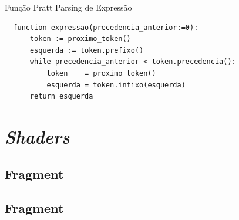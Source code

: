 \documentclass[english, 
               brazil, 
               bsc] %
               {dcomp-abntex2}
\begin{document}
\begin{algoritmo}[H]
	\caption{Função Pratt Parsing de Expressão}
	\label{alg1}
  \begin{lstlisting}
  function expressao(precedencia_anterior:=0):
      token := proximo_token()
      esquerda := token.prefixo()
      while precedencia_anterior < token.precedencia():
          token    = proximo_token()
          esquerda = token.infixo(esquerda)
      return esquerda
  \end{lstlisting}
\end{algoritmo}

%
%



\section{\textit{Shaders}}
\subsection{Fragment}
\subsection{Fragment}


% 
% 
% 
% 
% 




\postextual

\renewcommand{\chapnumfont}{\chaptitlefont}
\renewcommand{\afterchapternum}{}
% 
% 
\end{document}
